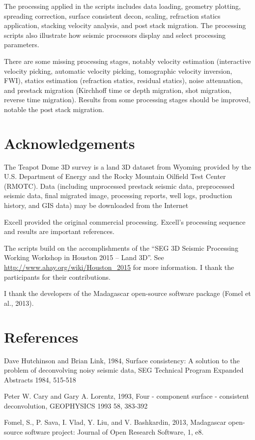 The processing applied in the scripts includes data loading, geometry plotting, spreading correction, surface consistent decon, scaling, refraction statics application, stacking velocity analysis, and post stack migration.  The processing scripts also illustrate how seismic processors display and select processing parameters. 

There are some missing processing stages, notably velocity estimation (interactive velocity picking, automatic velocity picking, tomographic velocity inversion, FWI), statics estimation (refraction statics, residual statics), noise attenuation, and prestack migration (Kirchhoff time or depth migration, shot migration, reverse time migration).  Results from some processing stages should be improved, notable the post stack migration.

\section{Acknowledgements} 

The Teapot Dome 3D survey is a land 3D dataset from Wyoming provided by the U.S. Department of Energy and the Rocky Mountain Oilfield Test Center (RMOTC).  Data (including unprocessed prestack seismic data, preprocessed seismic data, final migrated image, processing reports, well logs, production history, and GIS data) may be downloaded from the Internet

Excell provided the original commercial processing.  Excell's processing sequence and results are important references.

The scripts build on the accomplishments of the ``SEG 3D Seismic Processing Working Workshop in Houston 2015 – Land 3D''.  See 
\url{http://www.ahay.org/wiki/Houston_2015} for more information.  I thank the participants for their contributions.

I thank the developers of the Madagascar open-source software package (Fomel et al., 2013).

\section{References}

Dave Hutchinson and Brian Link, 1984, Surface consistency: A solution to the problem of deconvolving noisy seismic data,  SEG Technical Program Expanded Abstracts 1984, 515-518 

 Peter W. Cary and Gary A. Lorentz, 1993, Four - component surface - consistent deconvolution, GEOPHYSICS 1993 58, 383-392 

Fomel, S., P. Sava, I. Vlad, Y. Liu, and V. Bashkardin, 2013, Madagascar open-source software project: Journal of Open Research Software, 1, e8. 


